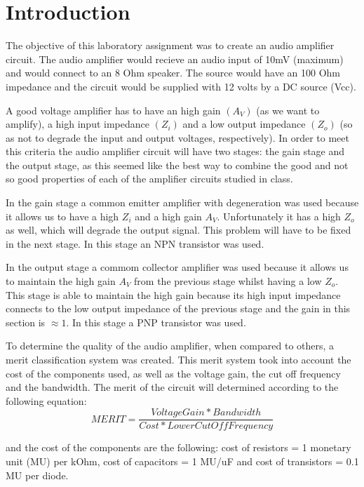 \section{Introduction}
\label{sec:introduction}


\par The objective of this laboratory assignment was to create an audio amplifier circuit. The audio amplifier would recieve an audio input of 10mV (maximum) and would connect to an 8 Ohm speaker. The source would have an 100 Ohm impedance and the circuit would be supplied with 12 volts by a DC source (Vcc).
\par A good voltage amplifier has to have an high gain $(A_{V})$ (as we want to amplify), a high input impedance $(Z_{i})$ and a low output impedance $(Z_{o})$ (so as not to degrade the input and output voltages, respectively). In order to meet this criteria the audio amplifier circuit will have two stages: the gain stage and the output stage, as this seemed like the best way to combine the good and not so good properties of each of the amplifier circuits studied in class.\par
 In the gain stage a common emitter amplifier with degeneration was used because it allows us to have a high $Z_{i}$ and a high gain $A_{V}$. Unfortunately it has a high $Z_{o}$ as well, which will degrade the output signal. This problem will have to be fixed in the next stage. In this stage an NPN transistor was used.\par
 In the output stage a commom collector amplifier was used because it allows us to maintain  the high gain $A_{V}$ from the previous stage whilst having a low $Z_{o}$. This stage is able to maintain the high gain because its high input impedance connects to the low output impedance of the previous stage and the gain in this section is $\approx 1$. In this stage a PNP transistor was used.
\par   
To determine the quality of the audio amplifier, when compared to others, a merit classification system was created. This merit system took into account the cost of the components used, as well as the voltage gain, the cut off frequency and the bandwidth. The merit of the circuit will determined according to the following equation: 
\begin {equation}
	 MERIT = \frac{Voltage Gain*Bandwidth}{Cost*Lower Cut Off Frequency}   	
	\label{eq:i1}
\end{equation}

and the cost of the components are the following: cost of resistors = 1 monetary unit (MU) per kOhm, cost of capacitors = 1 MU/uF
and cost of transistors = 0.1 MU per diode. 

